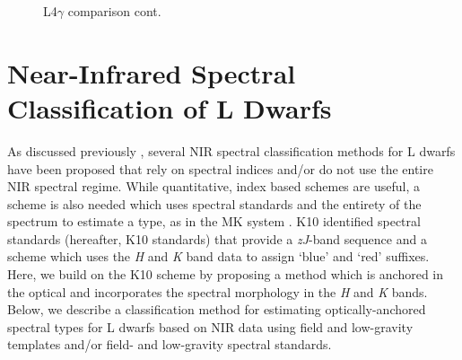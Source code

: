 \documentclass[12pt]{aastex6}
\begin{document}
\begin{figure}
     \caption{L4$\gamma$ comparison cont.}
\end{figure}
\clearpage

\section{Near-Infrared Spectral Classification of L Dwarfs}
\label{sec:classification}

As discussed previously
, several NIR spectral classification methods for L dwarfs have been proposed that rely on spectral indices and/or do not use the entire NIR spectral regime.
While quantitative, index based schemes are useful, a scheme is also needed which uses spectral standards and the entirety of the spectrum to estimate a type, as in the MK system \citep{Morgan:1984wy,Cushing:2014un}.
K10 identified spectral standards (hereafter, K10 standards) that provide a \emph{zJ}-band sequence and a scheme which uses the \emph{H} and \emph{K} band data to assign `blue' and `red' suffixes.
Here, we build on the K10 scheme by proposing a method which is anchored in the optical and incorporates the spectral morphology in the \emph{H} and \emph{K} bands.
Below, we describe a classification method for estimating optically-anchored spectral types for L dwarfs based on NIR data using field and low-gravity templates and/or field- and low-gravity spectral standards.
\end{document}
